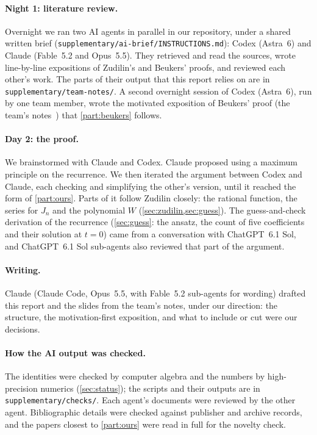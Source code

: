 \documentclass[11pt]{article}
\theoremstyle{plain}
\theoremstyle{definition}
\theoremstyle{remark}
\begin{document}
\paragraph{Night 1: literature review.} Overnight we ran two AI agents in parallel in our
repository, under a shared written brief (\texttt{supplementary/ai-brief/INSTRUCTIONS.md}): Codex (Astra~6) and
Claude (Fable~5.2 and Opus~5.5). They retrieved and read the sources, wrote line-by-line expositions
of Zudilin's and Beukers' proofs, and reviewed each other's work. The parts of their output that
this report relies on are in \texttt{supplementary/team-notes/}.
A second overnight session of Codex (Astra~6), run by one team member, wrote the motivated exposition of
Beukers' proof (the team's notes~\cite{codexnotes}) that \cref{part:beukers} follows.

\paragraph{Day 2: the proof.} We brainstormed with Claude and Codex. Claude proposed using a
maximum principle on the recurrence. We then iterated the argument between Codex and Claude,
each checking and simplifying the other's version, until it reached the form of \cref{part:ours}.
Parts of it follow Zudilin closely: the rational function, the series for $J_n$ and the
polynomial $W$ (\cref{sec:zudilin,sec:guess}).
The guess-and-check derivation of the recurrence (\cref{sec:guess}: the ansatz, the count of five
coefficients and their solution at $t=0$) came from a conversation with ChatGPT~6.1 Sol, and
ChatGPT~6.1 Sol sub-agents also reviewed that part of the argument.

\paragraph{Writing.} Claude (Claude Code, Opus~5.5, with Fable~5.2 sub-agents for wording) drafted
this report and the slides from the team's notes, under our direction: the structure, the
motivation-first exposition, and what to include or cut were our decisions.

\paragraph{How the AI output was checked.} The identities were checked by computer algebra and the
numbers by high-precision numerics (\cref{sec:status}); the scripts and their outputs are in
\texttt{supplementary/checks/}. Each agent's documents were reviewed by the other agent. Bibliographic details were
checked against publisher and archive records, and the papers closest to \cref{part:ours} were read
in full for the novelty check.
\end{document}
